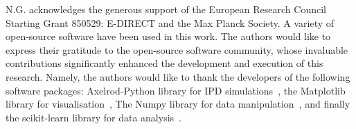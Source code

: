 \documentclass{article}
\begin{document}
N.G. acknowledges the generous support of the European Research Council Starting
Grant 850529: E-DIRECT and the Max Planck Society.
A variety of open-source software have been used in this work. The authors would
like to express their gratitude to the open-source software community, whose
invaluable contributions significantly enhanced the development and execution of
this research. Namely, the authors would like to thank the developers of the
following software packages: Axelrod-Python library for IPD
simulations~\cite{axelrodproject}, the Matplotlib library for
visualisation~\cite{hunter2007matplotlib}, The Numpy library for data
manipulation~\cite{walt2011numpy}, and finally the scikit-learn library for data
analysis~\cite{scikit-learn}.



\end{document}

